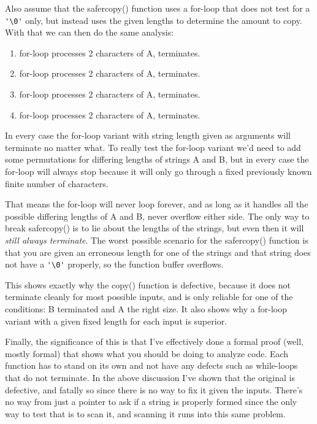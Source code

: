 Also assume that the safercopy() function uses a for-loop that does not test
for a \verb|'\0'| only, but instead uses the given lengths to determine the amount 
to copy.  With that we can then do the same analysis:

\begin{enumerate}
\item for-loop processes 2 characters of A, terminates.
\item for-loop processes 2 characters of A, terminates.
\item for-loop processes 2 characters of A, terminates.
\item for-loop processes 2 characters of A, terminates.
\end{enumerate}

In every case the for-loop variant with string length given as arguments will terminate
no matter what.  To really test the for-loop variant we'd need to add some permutations
for differing lengths of strings A and B, but in every case the for-loop
will always stop because it will only go through a fixed previously known finite number
of characters.

That means the for-loop will never loop forever, and as long as it handles all the
possible differing lengths of A and B, never overflow either side.  The only way to
break safercopy() is to lie about the lengths of the strings, but even then it will
\emph{still always terminate}.  The worst possible scenario for the safercopy() function
is that you are given an erroneous length for one of the strings and that string does
not have a \verb|'\0'| properly, so the function buffer overflows.

This shows exactly why the copy() function is defective, because it does not
terminate cleanly for most possible inputs, and is only reliable for one of the
conditions: B terminated and A the right size.  It also shows why a for-loop
variant with a given fixed length for each input is superior.

Finally, the significance of this is that I've effectively done a formal proof (well, mostly
formal) that shows what you should be doing to analyze code.  Each function has to stand on
its own and not have any defects such as while-loops that do not terminate.  In the above
discussion I've shown that the original \krc is defective, and fatally so since there is
no way to fix it given the inputs.  There's no way from just a pointer to ask if a 
string is properly formed since the only way to test that is to scan it, and scanning it
runs into this same problem.

